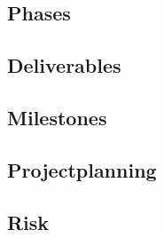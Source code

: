 \subsection{Phases}


\subsection{Deliverables}


\subsection{Milestones}


\subsection{Projectplanning}


\subsection{Risk}

